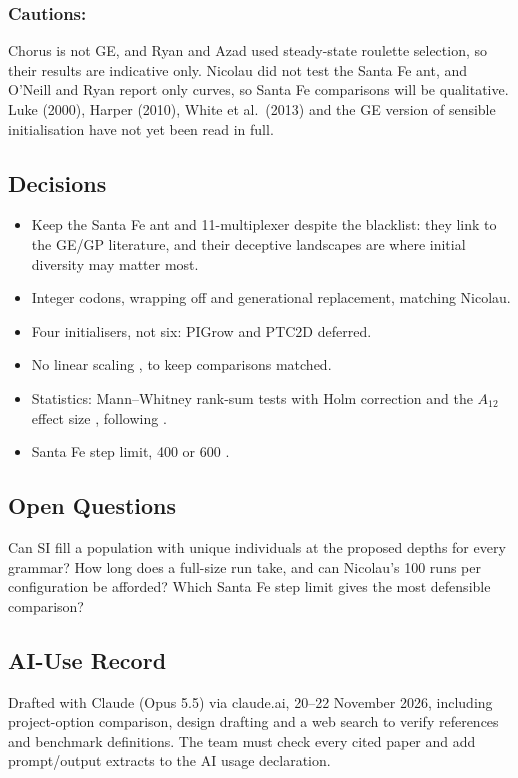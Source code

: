 \documentclass[11pt,a4paper]{article}
\begin{document}
    \subsubsection{Cautions:}
    Chorus is not GE, and Ryan and Azad used steady-state roulette selection, so their results are indicative only.
    Nicolau did not test the Santa Fe ant, and O'Neill and Ryan report only curves, so Santa Fe comparisons will be qualitative.
    Luke (2000), Harper (2010), White et al.\ (2013) and the GE version of sensible initialisation \citep{ryan2003ge} have not yet been read in full.

    \subsection{Decisions}\label{subsec:decisions}
    \begin{itemize}[leftmargin=*,itemsep=0pt]
        \item Keep the Santa Fe ant and 11-multiplexer \citep{koza1992} despite the blacklist: they link to the GE/GP literature, and their deceptive landscapes are where initial diversity may matter most.
        \item Integer codons, wrapping off and generational replacement, matching Nicolau.
        \item Four initialisers, not six: PIGrow and PTC2D deferred.
        \item No linear scaling \citep{keijzer2003}, to keep comparisons matched.
        \item Statistics: Mann--Whitney rank-sum tests \citep{mann1947} with Holm correction \citep{holm1979} and the $A_{12}$ effect size \citep{vargha2000}, following \citet{derrac2011}.
        \item Santa Fe step limit, 400 \citep{koza1992} or 600 \citep{langdon1998}.
    \end{itemize}

    \subsection{Open Questions}\label{subsec:open-questions}
    Can SI fill a population with unique individuals at the proposed depths for every grammar?
    How long does a full-size run take, and can Nicolau's 100 runs per configuration be afforded?
    Which Santa Fe step limit gives the most defensible comparison?

    \subsection{AI-Use Record}\label{subsec:ai-use-record}
    Drafted with Claude (Opus 5.5) via claude.ai, 20--22 November 2026, including project-option comparison, design drafting and a web search to verify references and benchmark definitions.
    The team must check every cited paper and add prompt/output extracts to the AI usage declaration.

    
    
\end{document}
